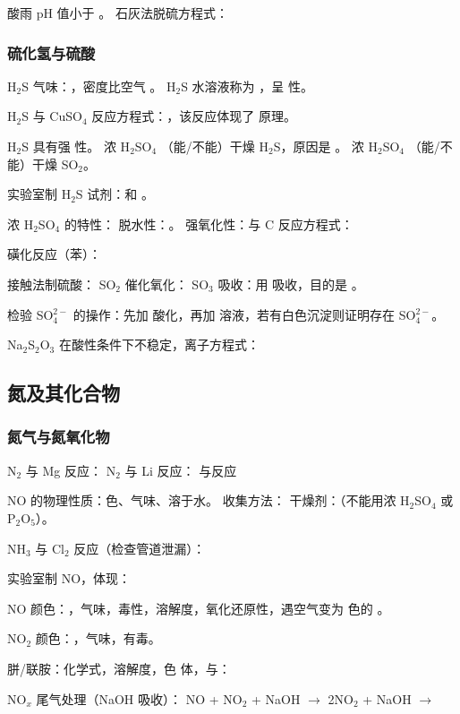 酸雨 pH 值小于 \sbl 。
石灰法脱硫方程式：\lbl

\subsubsection{硫化氢与硫酸}
H$_2$S 气味：\sbl ，密度比空气 \sbl 。
H$_2$S 水溶液称为 \sbl ，呈 \sbl 性。

H$_2$S 与 CuSO$_4$ 反应方程式：\lbl ，该反应体现了 \sbl 原理。

H$_2$S 具有强 \sbl 性。
浓 H$_2$SO$_4$ \sbl （能/不能）干燥 H$_2$S，原因是 \sbl 。
浓 H$_2$SO$_4$ \sbl （能/不能）干燥 SO$_2$。

实验室制 H$_2$S 试剂：\sbl 和 \sbl 。

浓 H$_2$SO$_4$ 的特性：
脱水性：\mbl 。
强氧化性：与 C 反应方程式：\lbl

磺化反应（苯）：

接触法制硫酸：
SO$_2$ 催化氧化：\lbl
SO$_3$ 吸收：用 \sbl 吸收，目的是 \sbl 。

检验 SO$_4^{2-}$ 的操作：先加 \sbl 酸化，再加 \sbl 溶液，若有白色沉淀则证明存在 SO$_4^{2-}$。

Na$_2$S$_2$O$_3$ 在酸性条件下不稳定，离子方程式：\lbl

\subsection{氮及其化合物}

\subsubsection{氮气与氮氧化物}
N$_2$ 与 Mg 反应：\lbl
N$_2$ 与 Li 反应：\lbl
与反应\clb

NO 的物理性质：\sbl 色、\sbl 气味、\sbl 溶于水。
收集方法：\sbl
干燥剂：\sbl （不能用浓 H$_2$SO$_4$ 或 P$_2$O$_5$）。

NH$_3$ 与 Cl$_2$ 反应（检查管道泄漏）：\lbl

实验室制 NO，体现\mbl ：

NO 颜色：\sbl ，气味\csb ，毒性\csb ，溶解度\csb ，氧化还原性\cmb ，遇空气变为 \sbl 色的 \mbl 。

NO$_2$ 颜色：\sbl ，\sbl 气味，有毒。

胼/联胺：化学式\csb ，溶解度\cmb ，\sbl 色 \sbl 体，与：


NO$_x$ 尾气处理（NaOH 吸收）：
NO + NO$_2$ + NaOH $\rightarrow$ \lbl
2NO$_2$ + NaOH $\rightarrow$ \lbl

